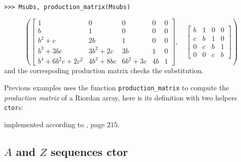 \begin{example}
\begin{verbatim}
>>> Msubs, production_matrix(Msubs)
\end{verbatim}
\begin{displaymath}
\left ( \left[\begin{matrix}1 & 0 & 0 & 0 & 0\\b & 1 & 0 & 0 & 0\\b^{2} + c & 2 b & 1 & 0 & 0\\b^{3} + 3 b c & 3 b^{2} + 2 c & 3 b & 1 & 0\\b^{4} + 6 b^{2} c + 2 c^{2} & 4 b^{3} + 8 b c & 6 b^{2} + 3 c & 4 b & 1\end{matrix}\right], \quad \left[\begin{matrix}b & 1 & 0 & 0\\c & b & 1 & 0\\0 & c & b & 1\\0 & 0 & c & b\end{matrix}\right]\right )
\end{displaymath}
and the correspoding production matrix checks the substitution.
\end{example}

Previous examples uses the function \verb|production_matrix| to compute the
\textit{production matrix} \citep{DEUTSCH2005101,Deutsch2009} of a Riordan
array, here is its definition with two helpers \verb|ctor|s:


implemented according to \citep{barry2017riordan}, page $215$.

\subsection{$A$ and $Z$ sequences ctor}


